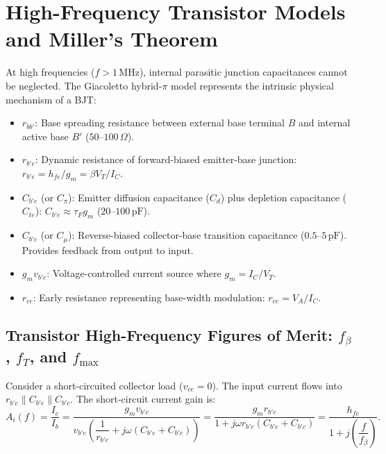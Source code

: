 \documentclass[12pt,a4paper]{article}
\begin{document}
\section{High-Frequency Transistor Models and Miller's Theorem}

\begin{tcolorbox}[defbox, title={High-Frequency Hybrid-$\pi$ (Giacoletto) Model}]
At high frequencies ($f > 1\,\mathrm{MHz}$), internal parasitic junction capacitances cannot be neglected. The Giacoletto hybrid-$\pi$ model represents the intrinsic physical mechanism of a BJT:
\begin{itemize}[leftmargin=1.5em, itemsep=2pt]
  \item $r_{bb'}$: Base spreading resistance between external base terminal $B$ and internal active base $B'$ ($50$--$100\,\Omega$).
  \item $r_{b'e}$: Dynamic resistance of forward-biased emitter-base junction: $r_{b'e} = h_{fe} / g_m = \beta V_T / I_C$.
  \item $C_{b'e}$ (or $C_\pi$): Emitter diffusion capacitance ($C_d$) plus depletion capacitance ($C_{te}$): $C_{b'e} \approx \tau_F g_m$ ($20$--$100\,\mathrm{pF}$).
  \item $C_{b'c}$ (or $C_\mu$): Reverse-biased collector-base transition capacitance ($0.5$--$5\,\mathrm{pF}$). Provides feedback from output to input.
  \item $g_m v_{b'e}$: Voltage-controlled current source where $g_m = I_C/V_T$.
  \item $r_{ce}$: Early resistance representing base-width modulation: $r_{ce} = V_A / I_C$.
\end{itemize}
\end{tcolorbox}

\subsection{Transistor High-Frequency Figures of Merit: \texorpdfstring{$f_\beta$, $f_T$, and $f_{\max}$}{f_beta, f_T, and f_max}}
Consider a short-circuited collector load ($v_{ce} = 0$). The input current flows into $r_{b'e} \parallel C_{b'e} \parallel C_{b'c}$. The short-circuit current gain is:
\[
A_i(f) = \frac{I_c}{I_b} = \frac{g_m v_{b'e}}{v_{b'e}\left(\dfrac{1}{r_{b'e}} + j\omega (C_{b'e} + C_{b'c})\right)} = \frac{g_m r_{b'e}}{1 + j\omega r_{b'e}(C_{b'e} + C_{b'c})} = \frac{h_{fe}}{1 + j\left(\dfrac{f}{f_\beta}\right)}.
\]
\end{document}
